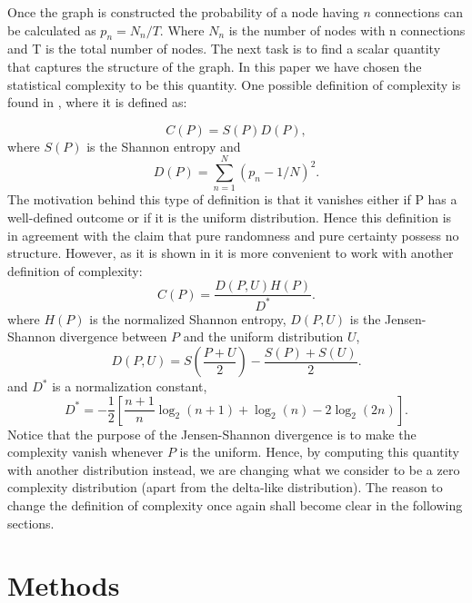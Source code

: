 \documentclass[fleqn,usenatbib]{mnras}
\begin{document}
Once the graph is constructed the probability of a node having $n$
connections can be calculated as $p_n=N_{n}/T$. Where $N_{n}$ is the
number of nodes with n connections and T is the total number of
nodes. The next task is to find a scalar quantity that captures the
structure of the graph. In this paper we have chosen the statistical
complexity to be this quantity. One possible definition of complexity
is found in \cite{lopez_comp}, where it is defined as: 

\begin{equation}
	C(P)=S(P)D(P),
\end{equation}
where $S(P)$ is the Shannon entropy and
\begin{equation}
	D(P)=\sum_{n=1}^{N}\left(p_n - 1/N\right)^{2}.
\end{equation}
The motivation behind this type of definition is that it vanishes
either if P has a well-defined outcome or if it is the uniform
distribution.  Hence this definition is in agreement with the claim
that pure randomness and pure certainty possess no structure.  
However, as it is shown in \cite{sig_com} it is more convenient to
work with another definition of complexity: 
\begin{equation}
    C(P)=\frac{D(P,U)H(P)}{D^{*}}.
    \label{eq:comp_def}
\end{equation}
where $H(P)$ is the normalized Shannon entropy, $D(P,U)$ is the
Jensen-Shannon divergence between $P$ and the uniform distribution
$U$, 
\begin{equation}
	D(P,U)=S\left(\frac{P+U}{2}\right) - \frac{S(P)+S(U)}{2}.
\end{equation}
and $D^{*}$ is a normalization constant,
\begin{equation}
    D^{*}=-\frac{1}{2}\left[\frac{n+1}{n}\log_2(n+1)+\log_2(n)-2\log_2(2n)\right].
\end{equation}
Notice that the purpose of the Jensen-Shannon divergence is to make
the complexity vanish whenever $P$ is the uniform. Hence, by computing
this quantity with another distribution instead, we are changing what
we consider to be a zero complexity distribution (apart from the
delta-like distribution). The reason to change the definition of
complexity once again shall become clear in the following sections. 
\section{Methods}
\end{document}
